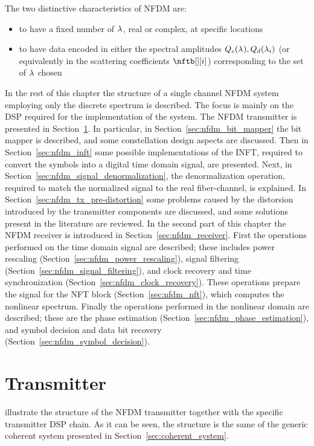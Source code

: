 The two distinctive characteristics of \ac{NFDM} are:
\begin{itemize}
 \item to have a fixed number of $\lambda_{}$, real or complex, at specific locations
 \item to have data encoded in either the spectral amplitudes $\cnft, \dnft[i]$ (or
equivalently in the scattering coefficients $\nftb[][i]$) corresponding to the set of
$\lambda_{}$ chosen
\end{itemize}

In the rest of this chapter the structure of a single channel \ac{NFDM} system employing only the discrete spectrum is described. The focus is mainly on the \ac{DSP} required for the implementation of the system. The \ac{NFDM} transmitter is presented in Section~\ref{sec:nfdm_transmitter}. In particular, in
Section~\ref{sec:nfdm_bit_mapper} the bit mapper is described, and some constellation design aspects are discussed. Then in
Section~\ref{sec:nfdm_inft} some possible implementations of the \ac{INFT}, required to convert the symbols into a digital time domain signal, are presented. Next, in
Section~\ref{sec:nfdm_signal_denormalization}, the denormalization
operation, required to match the normalized signal to the real fiber-channel, is explained. In
Section~\ref{sec:nfdm_tx_pre-distortion} some problems
caused by the distorsion introduced by the transmitter components are discussed, and
some solutions present in the literature are reviewed. In the second part of this chapter the
\ac{NFDM} receiver is introduced in Section~\ref{sec:nfdm_receiver}. First the operations performed on the time domain signal are described; these includes power rescaling (Section~\ref{sec:nfdm_power_rescaling}), signal filtering (Section~\ref{sec:nfdm_signal_filtering}), and clock recovery and time
synchronization (Section~\ref{sec:nfdm_clock_recovery}). These operations prepare the signal
for the \ac{NFT} block (Section~\ref{sec:nfdm_nft}), which computes the nonlinear
spectrum. Finally the operations performed in the nonlinear domain are described; these are the
phase estimation (Section~\ref{sec:nfdm_phase_estimation}), and symbol decision and
data bit recovery (Section~\ref{sec:nfdm_symbol_decision}).


\section{Transmitter}\label{sec:nfdm_transmitter}
 illustrate the structure of the \ac{NFDM} transmitter together with the specific transmitter \ac{DSP} chain. As it can be seen, the structure is the same of the generic coherent system presented in Section~\ref{sec:coherent_system}.

